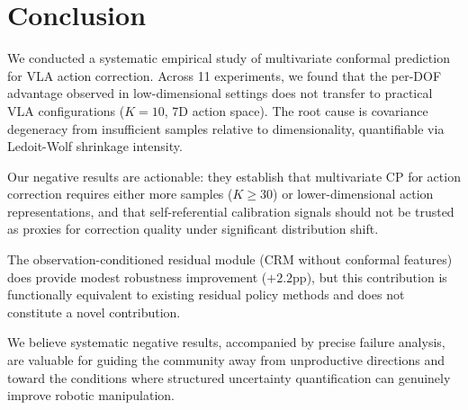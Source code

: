 \documentclass[letterpaper]{article}
\begin{document}
\section{Conclusion}
\label{sec:conclusion}

We conducted a systematic empirical study of multivariate conformal prediction for VLA action correction. Across 11 experiments, we found that the per-DOF advantage observed in low-dimensional settings does not transfer to practical VLA configurations ($K{=}10$, 7D action space). The root cause is covariance degeneracy from insufficient samples relative to dimensionality, quantifiable via Ledoit-Wolf shrinkage intensity.

Our negative results are actionable: they establish that multivariate CP for action correction requires either more samples ($K \geq 30$) or lower-dimensional action representations, and that self-referential calibration signals should not be trusted as proxies for correction quality under significant distribution shift.

The observation-conditioned residual module (CRM without conformal features) does provide modest robustness improvement ($+2.2$pp), but this contribution is functionally equivalent to existing residual policy methods and does not constitute a novel contribution.

We believe systematic negative results, accompanied by precise failure analysis, are valuable for guiding the community away from unproductive directions and toward the conditions where structured uncertainty quantification can genuinely improve robotic manipulation.


\end{document}
